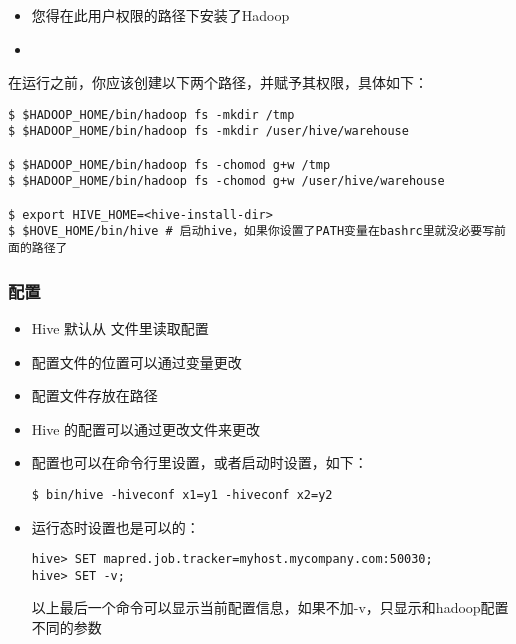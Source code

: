 \documentclass{article}
\begin{document}
\begin{itemize}
\item 您得在此用户权限的路径下安装了Hadoop
\item {}
\end{itemize}

在运行之前，你应该创建以下两个路径，并赋予其权限，具体如下：

\begin{verbatim}
$ $HADOOP_HOME/bin/hadoop fs -mkdir /tmp
$ $HADOOP_HOME/bin/hadoop fs -mkdir /user/hive/warehouse

$ $HADOOP_HOME/bin/hadoop fs -chomod g+w /tmp
$ $HADOOP_HOME/bin/hadoop fs -chomod g+w /user/hive/warehouse

$ export HIVE_HOME=<hive-install-dir>
$ $HOVE_HOME/bin/hive # 启动hive，如果你设置了PATH变量在bashrc里就没必要写前面的路径了

\end{verbatim}

\subsubsection{配置}
\begin{itemize}
\item Hive 默认从 文件里读取配置
\item 配置文件的位置可以通过变量更改
\item {} 配置文件存放在路径
\item Hive 的配置可以通过更改文件来更改
\item 配置也可以在命令行里设置，或者启动时设置，如下：

\begin{verbatim}
$ bin/hive -hiveconf x1=y1 -hiveconf x2=y2
\end{verbatim}

\item 运行态时设置也是可以的：

\begin{verbatim}
hive> SET mapred.job.tracker=myhost.mycompany.com:50030;
hive> SET -v;
\end{verbatim}

以上最后一个命令可以显示当前配置信息，如果不加-v，只显示和hadoop配置不同的参数
\end{itemize}
\end{document}
